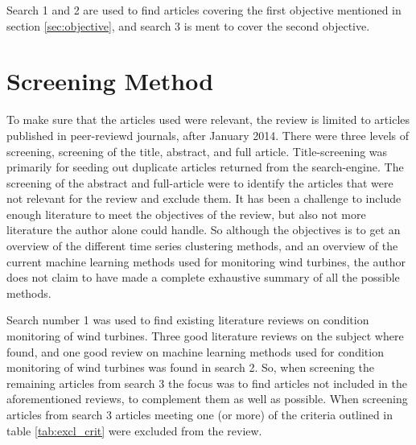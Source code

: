 Search 1 and 2 are used to find articles covering the first objective mentioned in section \ref{sec:objective}, and search 3 is ment to cover the second objective.
\newpage
\section{Screening Method} \label{sec:screening}
To make sure that the articles used were relevant, the review is limited to articles published in peer-reviewd journals, after January 2014. 
There were three levels of screening, screening of the title, abstract, and full article. 
Title-screening was primarily for seeding out duplicate articles returned from the search-engine. 
The screening of the abstract and full-article were to identify the articles that were not relevant for the review and exclude them. 
It has been a challenge to include enough literature to meet the objectives of the review, but also not more literature the author alone could handle. 
So although the objectives is to get an overview of the different time series clustering methods, and an overview of the current machine learning methods used for monitoring wind turbines, the author does not claim to have made a complete exhaustive summary of all the possible methods. \bigskip

Search number 1 was used to find existing literature reviews on condition monitoring of wind turbines. 
Three good literature reviews on the subject where found, and one good review on machine learning methods used for condition monitoring of wind turbines was found in search 2. 
So, when screening the remaining articles from search 3 the focus was to find articles not included in the aforementioned reviews, to complement them as well as possible.
When screening articles from search 3 articles meeting one (or more) of the criteria outlined in table \ref{tab:excl_crit} were excluded from the review.

